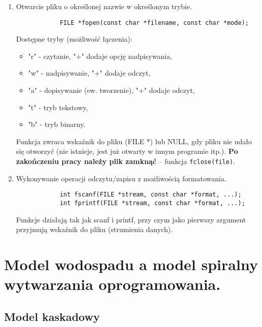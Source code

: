 \documentclass[main.tex]{subfiles}
\begin{document}
    \begin{enumerate}
        \item Otwarcie pliku o określonej nazwie w określonym trybie.
        \begin{verbatim}
            FILE *fopen(const char *filename, const char *mode);
        \end{verbatim}
        Dostępne tryby (możliwość łączenia):
        \begin{itemize}[noitemsep]
            \item "r" - czytanie, "+" dodaje opcję nadpisywania,
            \item "w" - nadpisywanie, "+" dodaje odczyt,
            \item "a" - dopisywanie (ew. tworzenie), "+" dodaje odczyt,
            \item "t" - tryb tekstowy,
            \item "b" - tryb binarny.
        \end{itemize}
        Funkcja zwraca wskaźnik do pliku (FILE *) lub NULL, gdy pliku nie udało się otworzyć (nie
        istnieje, jest już otwarty w innym programie itp.).
        \textbf{Po zakończeniu pracy należy plik zamknąć} -- funkcja \texttt{fclose(file)}.

        \item Wykonywanie operacji odczytu/zapisu z możliwością formatowania.
        \begin{verbatim}
            int fscanf(FILE *stream, const char *format, ...);
            int fprintf(FILE *stream, const char *format, ...);
        \end{verbatim}
        Funkcje działają tak jak scanf i printf, przy czym jako pierwszy argument przyjmują
        wskaźnik do pliku (strumienia danych).

    \end{enumerate}


    \section{Model wodospadu a model spiralny wytwarzania oprogramowania.}

    \subsection{Model kaskadowy}
\end{document}
